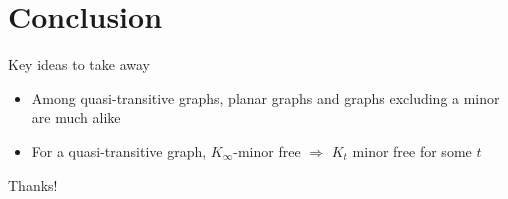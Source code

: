 \documentclass[11pt,dvipsnames,presentation,aspectratio=169]{beamer}
\begin{document}
\section*{Conclusion}
\begin{frame}{Key ideas to take away}
  \begin{itemize}
  \item Among quasi-transitive graphs, planar graphs and graphs excluding a
    minor are much alike
  \item For a quasi-transitive graph, $K_\infty$-minor free $\Rightarrow$ $K_t$
    minor free for some $t$
  \end{itemize}

  \vspace{1cm}
  \centering
  Thanks!
\end{frame}
\end{document}
